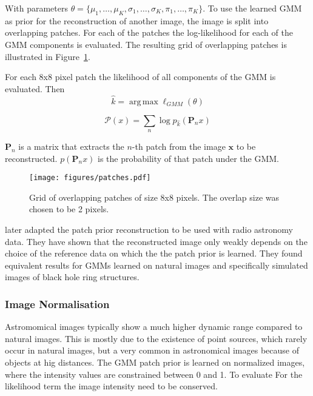 \documentclass[twocolumn]{aastex631}
\DeclareMathOperator*{\argmax}{arg\,max}
\begin{document}
    With parameters $\theta = \{\mu_1,\ldots,\mu_K,\sigma_1,\ldots,\sigma_K,\pi_1,\ldots,\pi_K\}$.
    To use the learned GMM as prior for the reconstruction of another image, the image is split into
    overlapping patches. For each of the patches the log-likelihood for each of the GMM components is
    evaluated. The resulting grid of overlapping patches is illustrated in Figure~\ref{fig:patches}.

    For each 8x8 pixel patch the likelihood of all components of the GMM is evaluated. Then 
    \begin{equation}
        \hat{k} = \argmax{\ell_{GMM}(\theta)}
    \end{equation}


    \begin{equation}
        \mathcal{P}(x) = \sum_n \log{p_{\hat{k}}(\mathbf{P}_n x)}
    \end{equation}

    $\mathbf{P}_n$ is a matrix that extracts the $n$-th patch
    from the image $\mathbf{x}$ to be reconstructed.
    $p(\mathbf{P}_n x)$ is the probability of that patch
    under the GMM.


    \begin{figure}[ht!]
        \begin{centering}
            \texttt{[image: figures/patches.pdf]}
            \caption{
                Grid of overlapping patches of size 8x8 pixels. The overlap size was chosen to be 2 pixels.
            }
            \label{fig:patches}
        \end{centering}
    \end{figure}

    \cite{Bouman2016} later adapted the patch prior reconstruction to be used
    with radio astronomy data.
    They have shown that the reconstructed image only weakly depends on the choice
    of the reference data on which the the patch prior is learned. They found
    equivalent results for GMMs learned on natural images and specifically
    simulated images of black hole ring structures.

    \subsubsection{Image Normalisation}
    Astromomical images typically show a much higher dynamic range compared to 
    natural images. This is mostly due to the existence of point sources, which rarely occur
    in natural images, but a very common in astronomical images because of objects 
    at hig distances.
    The GMM patch prior is learned on normalized images, where the intensity values
    are constrained between 0 and 1. To evaluate For the likelihood term the image
    intensity need to be conserved.
\end{document}

